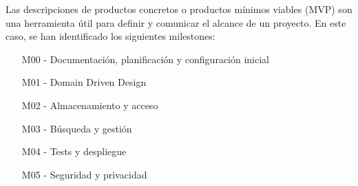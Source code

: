 Las descripciones de productos concretos o productos mínimos viables (MVP) son una herramienta útil para definir y comunicar el alcance de un proyecto. En este caso, se han identificado los siguientes milestones:

\begin{enumerate}
    \item [M00] - Documentación, planificación y configuración inicial
    \item [M01] - Domain Driven Design
    \item [M02] - Almacenamiento y acceso
    \item [M03] - Búsqueda y gestión
    \item [M04] - Tests y despliegue
    \item [M05] - Seguridad y privacidad
\end{enumerate}